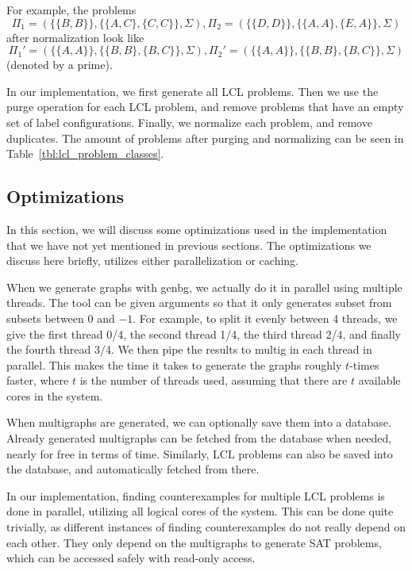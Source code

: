 For example, the problems $$\Pi_1=(\{\{B, B\}\}, \{\{A, C\}, \{C,C\}\}, \Sigma), \Pi_2=(\{\{D, D\}\}, \{\{A,A\},\{E, A\}\}, \Sigma)$$ after normalization look like $$\Pi_1'=(\{\{A, A\}\}, \{\{B,B\},\{B, C\}\}, \Sigma), \Pi_2'=(\{\{A, A\}\}, \{\{B,B\},\{B, C\}\}, \Sigma)$$ (denoted by a prime).

In our implementation, we first generate all LCL problems.
Then we use the purge operation for each LCL problem, and remove problems that have an empty set of label configurations.
Finally, we normalize each problem, and remove duplicates.
The amount of problems after purging and normalizing can be seen in Table~\ref{tbl:lcl_problem_classes}.



\subsection{Optimizations} \label{sec:implementation:optimizations}
In this section, we will discuss some optimizations used in the implementation that we have not yet mentioned in previous sections.
The optimizations we discuss here briefly, utilizes either parallelization or caching.

When we generate graphs with genbg, we actually do it in parallel using multiple threads.
The tool can be given arguments  so that it only generates subset  from subsets between $0$ and $-1$.
For example, to split it evenly between 4 threads, we give the first thread 0/4, the second thread 1/4, the third thread 2/4, and finally the fourth thread 3/4.
We then pipe the results to multig in each thread in parallel.
This makes the time it takes to generate the graphs roughly $t$-times faster, where $t$ is the number of threads used, assuming that there are $t$ available cores in the system.

When multigraphs are generated, we can optionally save them into a database.
Already generated multigraphs can be fetched from the database when needed, nearly for free in terms of time.
Similarly, LCL problems can also be saved into the database, and automatically fetched from there.

In our implementation, finding counterexamples for multiple LCL problems is done in parallel, utilizing all logical cores of the system.
This can be done quite trivially, as different instances of finding counterexamples do not really depend on each other.
They only depend on the multigraphs to generate SAT problems, which can be accessed safely with read-only access.
